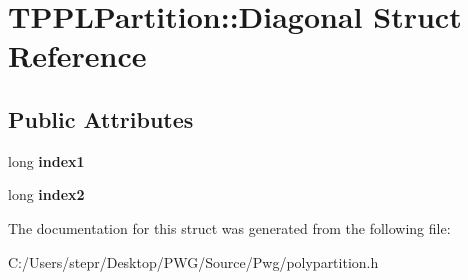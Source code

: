 \hypertarget{struct_t_p_p_l_partition_1_1_diagonal}{}\section{T\+P\+P\+L\+Partition\+:\+:Diagonal Struct Reference}
\label{struct_t_p_p_l_partition_1_1_diagonal}
\subsection*{Public Attributes}
\begin{DoxyCompactItemize}
\item 
\mbox{\label{struct_t_p_p_l_partition_1_1_diagonal_ac35e514d417f5a58c3846249eb036edd}} 
long {\bfseries index1}
\item 
\mbox{\label{struct_t_p_p_l_partition_1_1_diagonal_a8676eaedd6e19e021534b2f366fdd4e0}} 
long {\bfseries index2}
\end{DoxyCompactItemize}


The documentation for this struct was generated from the following file\+:\begin{DoxyCompactItemize}
\item 
C\+:/\+Users/stepr/\+Desktop/\+P\+W\+G/\+Source/\+Pwg/polypartition.\+h\end{DoxyCompactItemize}
